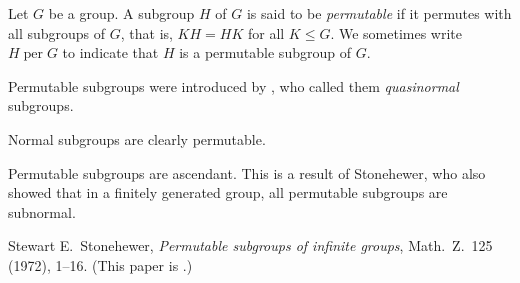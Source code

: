 \documentclass[12pt]{article}
\def\per{\operatorname{per}}
\begin{document}

Let $G$ be a group.
A subgroup $H$ of $G$ is said to be \emph{permutable}
if it permutes with all subgroups of $G$,
that is, $KH=HK$ for all $K\leq G$.
We sometimes write $H\per G$
to indicate that $H$ is a permutable subgroup of $G$.

Permutable subgroups were introduced by ,
who called them \emph{quasinormal} subgroups.

Normal subgroups are clearly permutable.

Permutable subgroups are ascendant.
This is a result of Stonehewer\cite{stonehewer}, 
who also showed that in a finitely generated group,
all permutable subgroups are subnormal.

\begin{thebibliography}{9}
 Stewart E.\ Stonehewer,
 {\it Permutable subgroups of infinite groups},
 Math.\ Z.\ 125 (1972), 1--16. (This paper is .)
\end{thebibliography}






\end{document}
